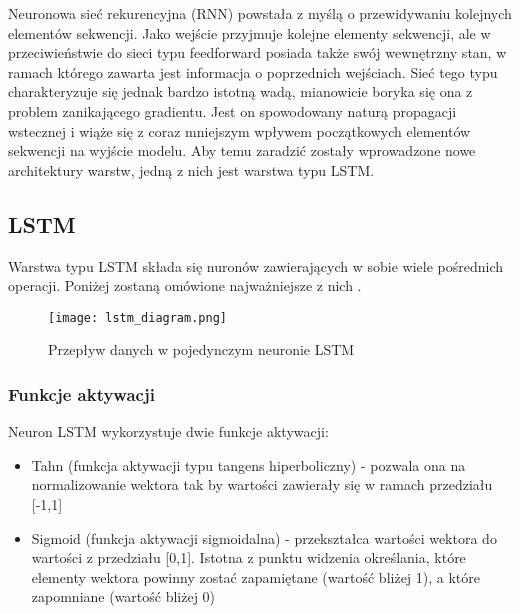 

Neuronowa sieć rekurencyjna (RNN) powstała z myślą o przewidywaniu kolejnych elementów sekwencji. Jako wejście przyjmuje kolejne elementy sekwencji, ale w przeciwieństwie do sieci typu feedforward posiada także swój wewnętrzny  stan, w ramach którego zawarta jest informacja o poprzednich wejściach. Sieć tego typu charakteryzuje się jednak bardzo istotną wadą, mianowicie boryka się ona z problem zanikającego gradientu. Jest on spowodowany naturą propagacji wstecznej i wiąże się z coraz mniejszym wpływem początkowych elementów sekwencji na wyjście modelu. Aby temu zaradzić zostały wprowadzone nowe architektury warstw, jedną z nich jest warstwa typu LSTM. \cite{RNN_1} \cite{RNN_2}




\subsection{\label{lstm_subsection}LSTM}




Warstwa typu LSTM składa się nuronów zawierających w sobie wiele pośrednich operacji. Poniżej zostaną omówione najważniejsze z nich \cite{LSTM_1}.

\begin{figure}[!h]
    \label{fig:lstm_diagram}
    \centering \texttt{[image: lstm\_diagram.png]}
    \caption{Przepływ danych w pojedynczym neuronie LSTM \cite{LSTM_1}}
\end{figure}




\subsubsection{Funkcje aktywacji}

Neuron LSTM wykorzystuje dwie funkcje aktywacji:

\begin{itemize}
    \item Tahn (funkcja aktywacji typu tangens hiperboliczny) - pozwala ona na normalizowanie wektora tak by wartości zawierały się w ramach przedziału [-1,1]
    \item Sigmoid (funkcja aktywacji sigmoidalna) - przekształca wartości wektora do wartości z przedziału [0,1]. Istotna z punktu widzenia określania, które elementy wektora powinny zostać zapamiętane (wartość bliżej 1), a które zapomniane (wartość bliżej 0)
\end{itemize}


